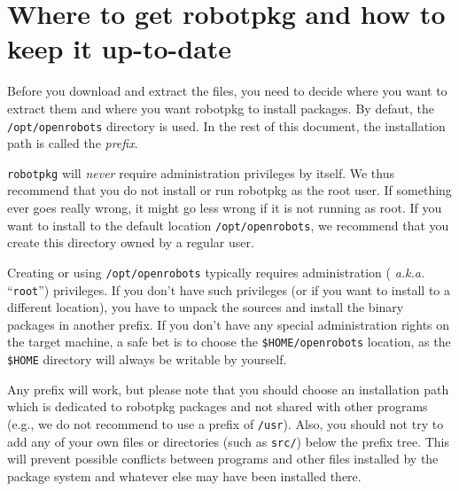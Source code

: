 %
%
%
%
%


\section{Where to get robotpkg and how to keep it up-to-date} %
\label{section:getting}

Before you download and extract the files, you need to decide where you want to
extract them and  where you want robotpkg to install  packages.  By defaut, the
{\tt  /opt/openrobots} directory is  used. In  the rest  of this  document, the
installation path is called the {\em prefix}.

{\tt robotpkg}  will {\em never}  require administration privileges  by itself.
We thus recommend that you do not install or run robotpkg as the root user.  If
something ever goes really  wrong, it might go less wrong if  it is not running
as root. If you want to  install to the default location {\tt /opt/openrobots},
we recommend that you create this directory owned by a regular user.

Creating or using {\tt /opt/openrobots} typically requires administration ({\em
a.k.a.}  ``{\tt root}'') privileges.  If  you don't have such privileges (or if
you want  to install to a different  location), you have to  unpack the sources
and  install the  binary packages  in  another prefix.  If you  don't have  any
special administration  rights on the target  machine, a safe bet  is to choose
the {\tt  \${HOME}/openrobots} location, as  the {\tt \${HOME}}  directory will
always be writable by yourself.

Any prefix  will work, but please  note that you should  choose an installation
path which is dedicated to robotpkg packages and not shared with other programs
(e.g., we do  not recommend to use  a prefix of {\tt /usr}).   Also, you should
not try to add any of your  own files or directories (such as {\tt src/}) below
the prefix  tree.  This  will prevent possible  conflicts between  programs and
other files  installed by the  package system and  whatever else may  have been
installed there.

